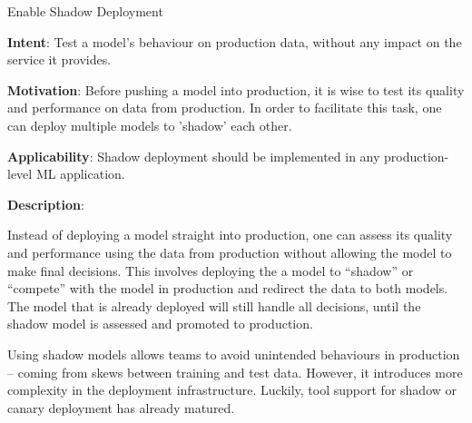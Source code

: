   
  \begin{frame}[plain]{ Enable Shadow Deployment
 }

  \textbf{Intent}: Test a model's behaviour on production data, without any impact on the service it provides. 
 

  \textbf{Motivation}: Before pushing a model into production, it is wise to test its quality and performance on data from production. In order to facilitate this task, one can deploy multiple models to 'shadow' each other. 
 

  \textbf{Applicability}: Shadow deployment should be implemented in any production-level ML application.
 

  \textbf{Description}: 

Instead of deploying a model straight into production, one can assess its quality and performance using the data from production without allowing the model to make final decisions.
This involves deploying the a model to ``shadow'' or ``compete'' with the model in production and redirect the data to both models.
The model that is already deployed will still handle all decisions, until the shadow model is assessed and promoted to production.


Using shadow models allows teams to avoid unintended behaviours in production  -- coming from skews between training and test data.
However, it introduces more complexity in the deployment infrastructure.
Luckily, tool support for shadow or canary deployment has already matured.


 


  \end{frame}

